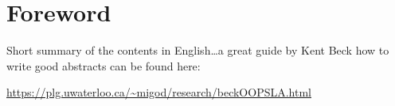 
\begingroup
\let\clearpage\relax
\let\cleardoublepage\relax
\let\cleardoublepage\relax

\chapter*{Foreword}
Short summary of the contents in English\dots a great guide by
Kent Beck how to write good abstracts can be found here:
\begin{center}
\url{https://plg.uwaterloo.ca/~migod/research/beckOOPSLA.html}
\end{center}

\endgroup
\vfill

